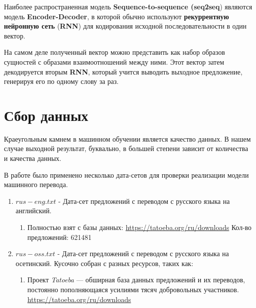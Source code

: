 \documentclass[a4paper,russian]{article}
\begin{document}
	Наиболее распространенная модель \textbf{Sequence-to-sequence (seq2seq}) являются модель \textbf{Encoder-Decoder}, в которой обычно используют \textbf{рекуррентную нейронную сеть} (\textbf{RNN}) для кодирования исходной последовательности в один вектор.
	
	На самом деле полученный вектор можно представить как набор образов сущностей с образами взаимоотношений между ними. Этот вектор затем декодируется вторым \textbf{RNN}, который учится выводить выходное предложение, генерируя его по одному слову за раз.
	
	\clearpage
	
	\section{Сбор данных}
	
	Краеугольным камнем в машинном обучении является качество данных. В нашем случае выходной результат, буквально, в большей степени зависит от количества и качества данных.
	
	В работе было применено несколько дата-сетов для проверки реализации модели машинного перевода.
	
	\begin{enumerate}
		\item $rus-eng.txt$ - Дата-сет предложений с переводом с русского языка на английский.
		\begin{enumerate}
			\item Полностью взят с базы данных: \url{https://tatoeba.org/ru/downloads} Кол-во предложений: 621481
		\end{enumerate}
		\item $rus-oss.txt$ - Дата-сет предложений с переводом с русского языка на осетинский.
		Кусочно собран с разных ресурсов, таких как:
		\begin{enumerate}
			 \item Проект \textit{Tatoeba} — обширная база данных предложений и их переводов, постоянно пополняющаяся усилиями тясяч добровольных участников. \url{https://tatoeba.org/ru/downloads}
 		\end{enumerate}
	\end{enumerate}
\end{document}
